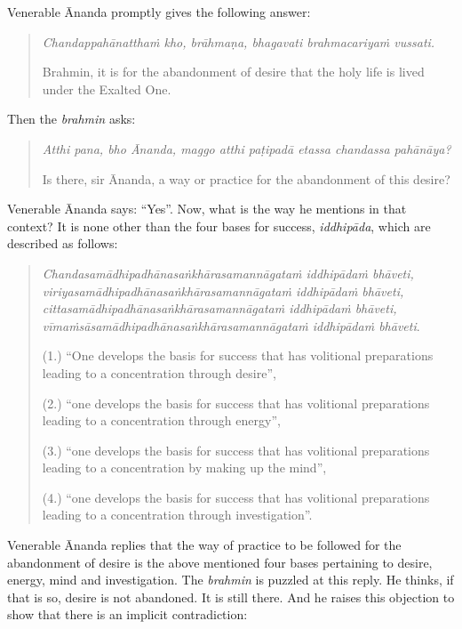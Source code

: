 Venerable Ānanda promptly gives the following answer:

\begin{quote}
\emph{Chandappahānatthaṁ kho, brāhmaṇa, bhagavati brahmacariyaṁ vussati.}

Brahmin, it is for the abandonment of desire that the holy life is lived under the Exalted One.
\end{quote}

Then the \emph{brahmin} asks:

\begin{quote}
\emph{Atthi pana, bho Ānanda, maggo atthi paṭipadā etassa chandassa pahānāya?}

Is there, sir Ānanda, a way or practice for the abandonment of this desire?
\end{quote}

Venerable Ānanda says: ``Yes''. Now, what is the way he mentions in that context? It is none other than the four bases for success, \emph{iddhipāda}, which are described as follows:

\begin{quote}
\emph{Chandasamādhipadhānasaṅkhārasamannāgataṁ iddhipādaṁ bhāveti,}\\
\emph{viriyasamādhipadhānasaṅkhārasamannāgataṁ iddhipādaṁ bhāveti,}\\
\emph{cittasamādhipadhānasaṅkhārasamannāgataṁ iddhipādaṁ bhāveti,}\\
\emph{vīmaṁsāsamādhipadhānasaṅkhārasamannāgataṁ iddhipādaṁ bhāveti}.

(1.) ``One develops the basis for success that has volitional preparations leading to a concentration through desire'',

(2.) ``one develops the basis for success that has volitional preparations leading to a concentration through energy'',

(3.) ``one develops the basis for success that has volitional preparations leading to a concentration by making up the mind'',

(4.) ``one develops the basis for success that has volitional preparations leading to a concentration through investigation''.
\end{quote}

Venerable Ānanda replies that the way of practice to be followed for the abandonment of desire is the above mentioned four bases pertaining to desire, energy, mind and investigation. The \emph{brahmin} is puzzled at this reply. He thinks, if that is so, desire is not abandoned. It is still there. And he raises this objection to show that there is an implicit contradiction:

